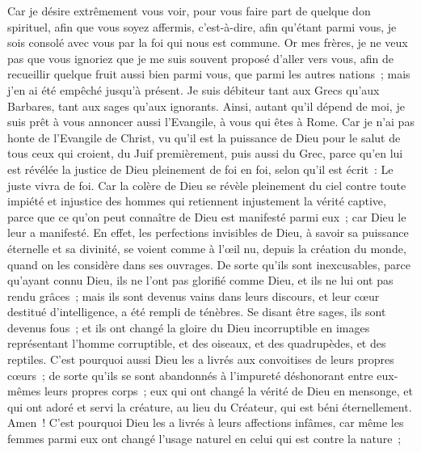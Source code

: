 \begin{multicols}{2}
Car je désire extrêmement vous voir, pour vous faire part de quelque don spirituel, afin que vous soyez affermis,
c'est-à-dire, afin qu'étant parmi vous, je sois consolé avec vous par la foi qui nous est commune.
Or mes frères, je ne veux pas que vous ignoriez que je me suis souvent proposé d'aller vers vous, afin de recueillir quelque fruit aussi bien parmi vous, que parmi les autres nations~; mais j'en ai été empêché jusqu'à présent.
Je suis débiteur tant aux Grecs qu'aux Barbares, tant aux sages qu'aux ignorants.
Ainsi, autant qu'il dépend de moi, je suis prêt à vous annoncer aussi l'Evangile, à vous qui êtes à Rome.
Car je n'ai pas honte de l'Evangile de Christ, vu qu'il est la puissance de Dieu pour le salut de tous ceux qui croient, du Juif premièrement, puis aussi du Grec,
parce qu'en lui est révélée la justice de Dieu pleinement de foi en foi, selon qu'il est écrit~: Le juste vivra de foi.
Car la colère de Dieu se révèle pleinement du ciel contre toute impiété et injustice des hommes qui retiennent injustement la vérité captive,
parce que ce qu'on peut connaître de Dieu est manifesté parmi eux~; car Dieu le leur a manifesté.
En effet, les perfections invisibles de Dieu, à savoir sa puissance éternelle et sa divinité, se voient comme à l'œil nu, depuis la création du monde, quand on les considère dans ses ouvrages. De sorte qu'ils sont inexcusables,
parce qu'ayant connu Dieu, ils ne l'ont pas glorifié comme Dieu, et ils ne lui ont pas rendu grâces~; mais ils sont devenus vains dans leurs discours, et leur cœur destitué d'intelligence, a été rempli de ténèbres.
Se disant être sages, ils sont devenus fous~;
et ils ont changé la gloire du Dieu incorruptible en images représentant l'homme corruptible, et des oiseaux, et des quadrupèdes, et des reptiles.
C'est pourquoi aussi Dieu les a livrés aux convoitises de leurs propres cœurs~; de sorte qu'ils se sont abandonnés à l'impureté déshonorant entre eux-mêmes leurs propres corps~;
eux qui ont changé la vérité de Dieu en mensonge, et qui ont adoré et servi la créature, au lieu du Créateur, qui est béni éternellement. Amen~!
C'est pourquoi Dieu les a livrés à leurs affections infâmes, car même les femmes parmi eux ont changé l'usage naturel en celui qui est contre la nature~;

\end{multicols}
